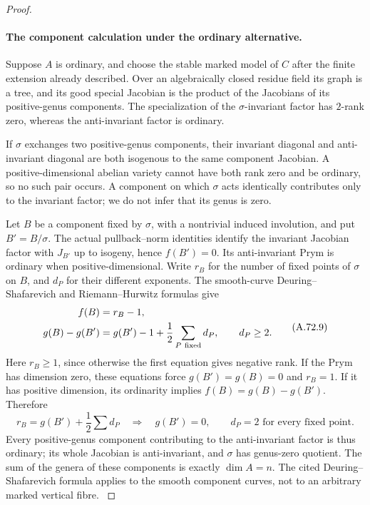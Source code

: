 \begin{proof}
\paragraph{The component calculation under the ordinary alternative.}
Suppose \(A\) is ordinary, and choose the stable marked model
of \(C\) after the finite extension already described. Over
an algebraically closed residue field its graph is a tree, and
its good special Jacobian is the product of the Jacobians of
its positive-genus components. The specialization of the
\(\sigma\)-invariant factor has \(2\)-rank zero, whereas
the anti-invariant factor is ordinary.

If \(\sigma\) exchanges two positive-genus components, their
invariant diagonal and anti-invariant diagonal are both
isogenous to the same component Jacobian. A positive-dimensional
abelian variety cannot have both rank zero and be ordinary,
so no such pair occurs. A component on which \(\sigma\)
acts identically contributes only to the invariant factor;
we do not infer that its genus is zero.

Let \(B\) be a component fixed by \(\sigma\), with a
nontrivial induced involution, and put \(B'=B/\sigma\).
The actual pullback--norm identities identify the invariant
Jacobian factor with \(J_{B'}\) up to isogeny, hence
\(f(B')=0\). Its anti-invariant Prym is ordinary when
positive-dimensional. Write \(r_B\) for the number of fixed
points of \(\sigma\) on \(B\), and \(d_P\) for their
different exponents. The smooth-curve Deuring--Shafarevich
and Riemann--Hurwitz formulas give
\[
 \begin{aligned}
 f(B)&=r_B-1,\\
 g(B)-g(B')&=g(B')-1+\frac12\sum_{P\ {\rm fixed}}d_P,
                    \qquad d_P\ge2.
 \end{aligned}                                         \tag{A.72.9}
\]
Here \(r_B\ge1\), since otherwise the first equation gives
negative rank. If the Prym has dimension zero, these equations
force \(g(B')=g(B)=0\) and \(r_B=1\). If it has positive
dimension, its ordinarity implies
\(f(B)=g(B)-g(B')\). Therefore
\[
 r_B=g(B')+\frac12\sum d_P
       \quad\Longrightarrow\quad
 g(B')=0,\qquad d_P=2\text{ for every fixed point}.
                                                        \tag{A.72.10}
\]
Every positive-genus component contributing to the anti-invariant
factor is thus ordinary; its whole Jacobian is anti-invariant,
and \(\sigma\) has genus-zero quotient. The sum of the genera
of these components is exactly \(\dim A=n\).
The cited Deuring--Shafarevich formula applies to the smooth
component curves, not to an arbitrary marked vertical fibre.
\cite[Corollary 1.8]{fghCrew1984}
\cite[Proposition 1.4]{fghYang2024}


\end{proof}
